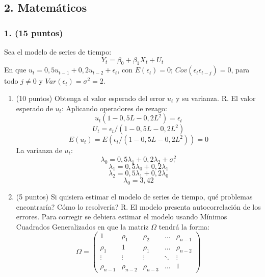 \documentclass[twocolumn, 11pt, letterpaper]{article}
\begin{document}
\subsection*{2. Matemáticos}

\subsubsection*{1. (15 puntos)} Sea el modelo de series de tiempo:
$$ Y_t = \beta_0 + \beta_1 X_t + U_t $$
En que $u_t = 0,5u_{t-1} + 0,2u_{t-2} + \epsilon_t$, con $E(\epsilon_t) = 0$; $Cov(\epsilon_t \epsilon_{t-j}) = 0$, para todo $j \neq 0$ y $Var(\epsilon_t) = \sigma^2 = 2$.
\begin{enumerate}[label=\alph*)]
    \item (10 puntos) Obtenga el valor esperado del error $u_t$ y su varianza.
    R. El valor esperado de $u_t$:
    Aplicando operadores de rezago:
    $$ u_t(1 - 0,5L - 0,2L^2) = \epsilon_t $$
    $$ U_t = \epsilon_t/(1-0,5L - 0,2L^2) $$
    $$ E(u_t) = E(\epsilon_t/(1 - 0,5L - 0,2L^2)) = 0 $$
    La varianza de $u_t$:
    $$ \lambda_0 = 0,5\lambda_1 + 0,2\lambda_2 + \sigma^2_\epsilon $$
    $$ \lambda_1 = 0,5\lambda_0 + 0,2\lambda_1 $$
    $$ \lambda_2 = 0,5\lambda_1 + 0,2\lambda_0 $$
    $$ \lambda_0 = 3,42 $$
    \item (5 puntos) Si quisiera estimar el modelo de series de tiempo, qué problemas encontraría? Cómo lo resolvería?
    R. El modelo presenta autocorrelación de los errores. Para corregir se debiera estimar el modelo usando Mínimos Cuadrados Generalizados en que la matriz $\Omega$ tendrá la forma:
    $$ \Omega = \begin{pmatrix}
        1 & \rho_1 & \rho_2 & \dots & \rho_{n-1} \\
        \rho_1 & 1 & \rho_1 & \dots & \rho_{n-2} \\
        \vdots & \vdots & \vdots & \ddots & \vdots \\
        \rho_{n-1} & \rho_{n-2} & \rho_{n-3} & \dots & 1
    \end{pmatrix} $$
\end{enumerate}
\end{document}
